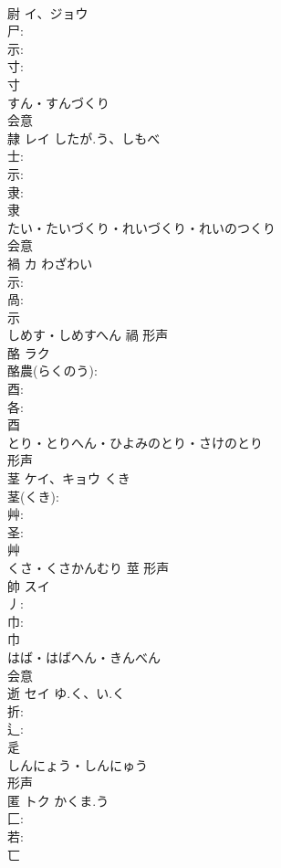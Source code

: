 \documentclass[8pt]{extreport}
\begin{document}
\begin{CJK}{UTF8}{min}
\\	尉	イ、ジョウ			
\\	尸: 
\\	示: 
\\	寸: 
\\	寸	
\\	すん・すんづくり	
\\	会意 
\\	隷	レイ	したが.う、しもべ		
\\	士: 
\\	示: 
\\	隶: 
\\	隶	
\\	たい・たいづくり・れいづくり・れいのつくり	
\\	会意 
\\	禍	カ	わざわい		
\\	示: 
\\	咼: 
\\	示	
\\	しめす・しめすへん	禍	形声 
\\	酪	ラク			
\\	酪農(らくのう): 
\\	酉: 
\\	各: 
\\	酉	
\\	とり・とりへん・ひよみのとり・さけのとり	
\\	形声 
\\	茎	ケイ、キョウ	くき		
\\	茎(くき): 
\\	艸: 
\\	圣: 
\\	艸	
\\	くさ・くさかんむり	莖	形声 
\\	帥	スイ			
\\	丿: 
\\	巾: 
\\	巾	
\\	はば・はばへん・きんべん	
\\	会意 
\\	逝	セイ	ゆ.く、い.く		
\\	折: 
\\	辶: 
\\	辵	
\\	しんにょう・しんにゅう	
\\	形声 
\\	匿	トク	かくま.う		
\\	匚: 
\\	若: 
\\	匸	

\end{CJK}
\end{document}

